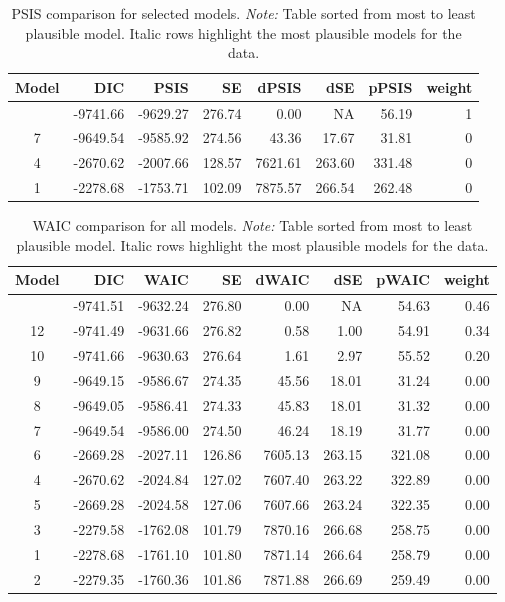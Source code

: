 \documentclass[
  authoryear,
  preprint,
  1p]{elsarticle}
\begin{document}
\begin{longtable}[]{@{}crrrrrrr@{}}

\caption{\label{tbl-rq1-psis}PSIS comparison for selected models.
\emph{Note:} Table sorted from most to least plausible model. Italic
rows highlight the most plausible models for the data.}

\tabularnewline

\toprule\noalign{}
Model & DIC & PSIS & SE & dPSIS & dSE & pPSIS & weight \\
\midrule\noalign{}
\endhead
\bottomrule\noalign{}
\endlastfoot
10 & -9741.66 & -9629.27 & 276.74 & 0.00 & NA & 56.19 & 1 \\
7 & -9649.54 & -9585.92 & 274.56 & 43.36 & 17.67 & 31.81 & 0 \\
4 & -2670.62 & -2007.66 & 128.57 & 7621.61 & 263.60 & 331.48 & 0 \\
1 & -2278.68 & -1753.71 & 102.09 & 7875.57 & 266.54 & 262.48 & 0 \\

\end{longtable}

\begin{longtable}[]{@{}crrrrrrr@{}}

\caption{\label{tbl-rq3-waic}WAIC comparison for all models.
\emph{Note:} Table sorted from most to least plausible model. Italic
rows highlight the most plausible models for the data.}

\tabularnewline

\toprule\noalign{}
Model & DIC & WAIC & SE & dWAIC & dSE & pWAIC & weight \\
\midrule\noalign{}
\endhead
\bottomrule\noalign{}
\endlastfoot
11 & -9741.51 & -9632.24 & 276.80 & 0.00 & NA & 54.63 & 0.46 \\
12 & -9741.49 & -9631.66 & 276.82 & 0.58 & 1.00 & 54.91 & 0.34 \\
10 & -9741.66 & -9630.63 & 276.64 & 1.61 & 2.97 & 55.52 & 0.20 \\
9 & -9649.15 & -9586.67 & 274.35 & 45.56 & 18.01 & 31.24 & 0.00 \\
8 & -9649.05 & -9586.41 & 274.33 & 45.83 & 18.01 & 31.32 & 0.00 \\
7 & -9649.54 & -9586.00 & 274.50 & 46.24 & 18.19 & 31.77 & 0.00 \\
6 & -2669.28 & -2027.11 & 126.86 & 7605.13 & 263.15 & 321.08 & 0.00 \\
4 & -2670.62 & -2024.84 & 127.02 & 7607.40 & 263.22 & 322.89 & 0.00 \\
5 & -2669.28 & -2024.58 & 127.06 & 7607.66 & 263.24 & 322.35 & 0.00 \\
3 & -2279.58 & -1762.08 & 101.79 & 7870.16 & 266.68 & 258.75 & 0.00 \\
1 & -2278.68 & -1761.10 & 101.80 & 7871.14 & 266.64 & 258.79 & 0.00 \\
2 & -2279.35 & -1760.36 & 101.86 & 7871.88 & 266.69 & 259.49 & 0.00 \\

\end{longtable}
\end{document}
